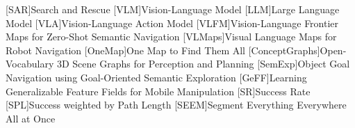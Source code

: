 [SAR]{Search and Rescue}
[VLM]{Vision-Language Model}
[LLM]{Large Language Model}
[VLA]{Vision-Language Action Model}
[VLFM]{Vision-Language Frontier Maps for Zero-Shot Semantic Navigation}
[VLMaps]{Visual Language Maps for Robot Navigation}
[OneMap]{One Map to Find Them All}
[ConceptGraphs]{Open-Vocabulary 3D Scene Graphs for Perception and Planning}
[SemExp]{Object Goal Navigation using
Goal-Oriented Semantic Exploration}
[GeFF]{Learning Generalizable Feature Fields for Mobile Manipulation}
[SR]{Success Rate}
[SPL]{Success weighted by Path Length}
[SEEM]{Segment Everything Everywhere All at Once}

